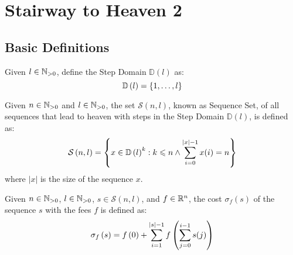 \newcommand{\apply}[2]{\ensuremath{#1 \left( #2 \right)}}
\newcommand{\domain}{\ensuremath{\mathbb{D}}}
\newcommand{\domainf}[1]{\apply{\domain}{#1}}
\newcommand{\stepLimit}{\ensuremath{l}}
\newcommand{\fees}{\ensuremath{f}}
\newcommand{\fee}[1]{\apply{\fees}{#1}}
\newcommand{\nSteps}{\ensuremath{n}}
\newcommand{\oneN}{\ensuremath{\N_{>0}}}
\newcommand{\solution}{\ensuremath{s}}
\renewcommand{\length}[1]{\ensuremath{\left| #1 \right|}}
\newcommand{\allSequences}[2]{\ensuremath{\apply{\mathcal{S}}{#1, #2}}}
\newcommand{\cost}[2]{\ensuremath{\apply{\sigma_{#1}}{#2}}}
\newcommand{\ArgMin}[2]{\argmin\limits_{#1} \ #2}

\chapter{Stairway to Heaven 2}

\section{Basic Definitions}

\begin{defn}
    Given $\stepLimit \in \oneN$, define the Step Domain $\domainf{\stepLimit}$ as:
    \begin{equation}
        \domainf{l} = \Set{1, \dots, \stepLimit}
    \end{equation}
\end{defn}

\begin{defn}
    Given $\nSteps \in \oneN$ and $\stepLimit \in \oneN$, the set $\allSequences{\nSteps}{\stepLimit}$, known as Sequence Set, of all sequences that lead to heaven with steps in the Step Domain $\domainf{\stepLimit}$, is defined as:
    \begin{equation}
        \allSequences{\nSteps}{\stepLimit}
        =
        \SetOf
            {x \in \domainf{\stepLimit}^k}
            {
                k \leqslant \nSteps \land
                \Sum{i = 0}{\length{x}-1}{x(i)} = \nSteps
            }
    \end{equation}
    where $\length{x}$ is the size of the sequence $x$.
\end{defn}

\begin{defn}
    Given $\nSteps \in \oneN$, $\stepLimit \in \oneN$, $\solution \in \allSequences{\nSteps}{\stepLimit}$, and $\fees \in \R^n$, the cost $\cost{\fees}{\solution}$ of the sequence $\solution$ with the fees $\fees$ is defined as:
    \begin{equation}
        \cost{\fees}{\solution} =
        \fee{0}
        +
        \Sum{i = 1}{\length{\solution} - 1}{\fee{\Sum{j=0}{i-1}{\solution(j)}}}
    \end{equation}
\end{defn}

